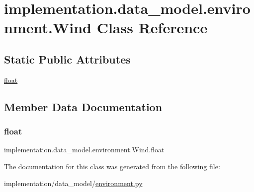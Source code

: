 \hypertarget{classimplementation_1_1data__model_1_1environment_1_1_wind}{}\section{implementation.\+data\+\_\+model.\+environment.\+Wind Class Reference}
\label{classimplementation_1_1data__model_1_1environment_1_1_wind}
\subsection*{Static Public Attributes}
\begin{DoxyCompactItemize}
\item 
\hyperlink{classimplementation_1_1data__model_1_1environment_1_1_wind_ae7ce0152f31c7d02f8a98f358341c377}{float}
\end{DoxyCompactItemize}


\subsection{Member Data Documentation}
\mbox{\label{classimplementation_1_1data__model_1_1environment_1_1_wind_ae7ce0152f31c7d02f8a98f358341c377}} 
\subsubsection{\texorpdfstring{float}{float}}
{\footnotesize\ttfamily implementation.\+data\+\_\+model.\+environment.\+Wind.\+float\hspace{0.3cm}{\ttfamily [static]}}



The documentation for this class was generated from the following file\+:\begin{DoxyCompactItemize}
\item 
implementation/data\+\_\+model/\hyperlink{environment_8py}{environment.\+py}\end{DoxyCompactItemize}
